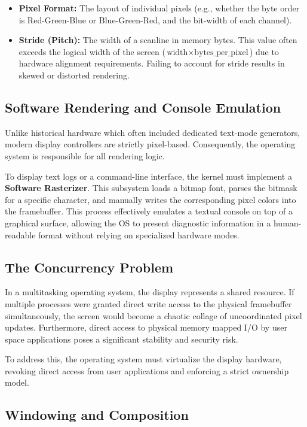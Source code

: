 \documentclass[a4paper,10pt,twoside]{report}
\theoremstyle{definition}
\begin{document}
\begin{itemize}
    \item \textbf{Pixel Format:} The layout of individual pixels (e.g., whether the byte order is Red-Green-Blue or Blue-Green-Red, and the bit-width of each channel).
    \item \textbf{Stride (Pitch):} The width of a scanline in memory bytes. This value often exceeds the logical width of the screen ($\text{width} \times \text{bytes\_per\_pixel}$) due to hardware alignment requirements. Failing to account for stride results in skewed or distorted rendering.
\end{itemize}

\subsection{Software Rendering and Console Emulation}

Unlike historical hardware which often included dedicated text-mode generators, modern display controllers are strictly pixel-based. Consequently, the operating system is responsible for all rendering logic.

To display text logs or a command-line interface, the kernel must implement a \textbf{Software Rasterizer}. This subsystem loads a bitmap font, parses the bitmask for a specific character, and manually writes the corresponding pixel colors into the framebuffer. This process effectively emulates a textual console on top of a graphical surface, allowing the OS to present diagnostic information in a human-readable format without relying on specialized hardware modes.

\subsection{The Concurrency Problem}

In a multitasking operating system, the display represents a shared resource. If multiple processes were granted direct write access to the physical framebuffer simultaneously, the screen would become a chaotic collage of uncoordinated pixel updates. Furthermore, direct access to physical memory mapped I/O by user space applications poses a significant stability and security risk.

To address this, the operating system must virtualize the display hardware, revoking direct access from user applications and enforcing a strict ownership model.

\subsection{Windowing and Composition}
\end{document}
